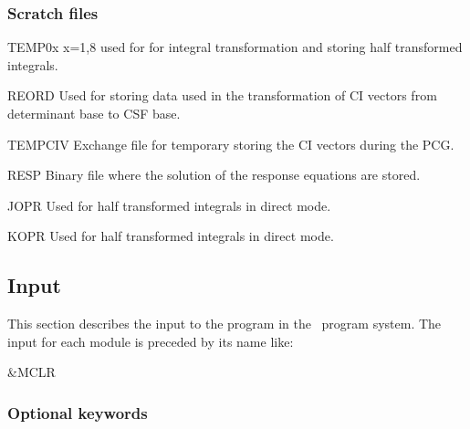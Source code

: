 \subsubsection{Scratch files}
\label{UG:sec:mclr_scratch_files}
\begin{filelist}
\item[TEMP0x]
x=1,8 used for for integral transformation and storing half transformed integrals.
\item[REORD]
Used for storing data used in the transformation of CI vectors from determinant base to CSF base.
\item[TEMPCIV]
Exchange file for temporary storing the CI vectors during the PCG.
\item[RESP]
Binary file where the solution of the response equations are stored.
\item[JOPR]
Used for half transformed integrals in direct mode.
\item[KOPR]
Used for half transformed integrals in direct mode.
\end{filelist}


\subsection{Input}
\label{UG:sec:mclr_input}

This section describes the input to the
 program in the \molcas\ program system.
The input for each module is preceded by its name like:
\begin{inputlisting}
 &MCLR
\end{inputlisting}


\subsubsection{Optional keywords}

